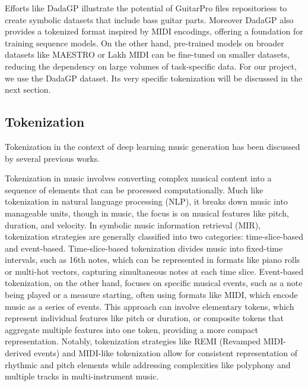 Efforts like DadaGP illustrate the potential of GuitarPro files repositoriess to create symbolic datasets that include bass guitar parts.
Moreover DadaGP also provides a tokenized format inspired by MIDI encodings, offering a foundation for training sequence models.
On the other hand, pre-trained models on broader datasets like MAESTRO or Lakh MIDI can be fine-tuned on smaller datasets, reducing the dependency on large volumes of task-specific data\cite{makris_conditional_2022, sarmento_dadagp_2021}.
For our project, we use the DadaGP dataset. Its very specific tokenization will be discussed in the next section.


\subsection{Tokenization}

Tokenization in the context of deep learning music generation has been discussed by several previous works\cite{agarwal_structure-informed_2024, makris_conditional_2022, sarmento_dadagp_2021, hsiao_compound_2021, cournut_encodages_2020}.

Tokenization in music involves converting complex musical content into a sequence of elements that can be processed computationally.
Much like tokenization in natural language processing (NLP), it breaks down music into manageable units, though in music, the focus is on musical features like pitch, duration, and velocity.
In symbolic music information retrieval (MIR), tokenization strategies are generally classified into two categories: time-slice-based and event-based. 
Time-slice-based tokenization divides music into fixed-time intervals, such as 16th notes, which can be represented in formats like piano rolls or multi-hot vectors, capturing simultaneous notes at each time slice.
Event-based tokenization, on the other hand, focuses on specific musical events, such as a note being played or a measure starting, often using formats like MIDI, which encode music as a series of events.
This approach can involve elementary tokens, which represent individual features like pitch or duration, or composite tokens that aggregate multiple features into one token, providing a more compact representation.
Notably, tokenization strategies like REMI (Revamped MIDI-derived events) and MIDI-like tokenization allow for consistent representation of rhythmic and pitch elements while addressing complexities like polyphony and multiple tracks in multi-instrument music\cite{le_natural_2024, cournut_encodages_2020}.



